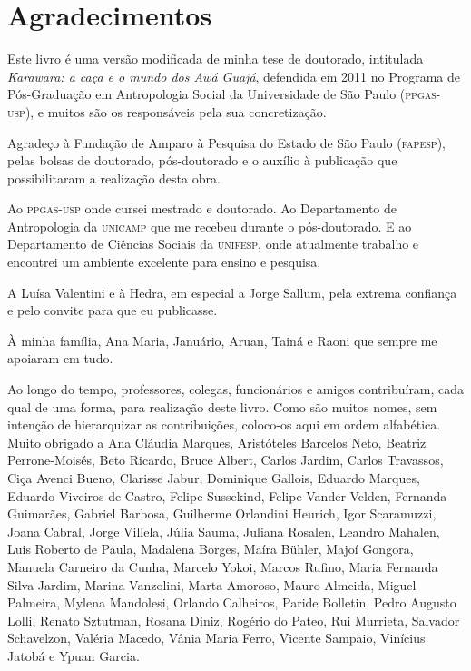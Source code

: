 \chapter{Agradecimentos}

Este livro é uma versão modificada de minha tese de doutorado,
intitulada \textit{Karawara: a caça e o mundo dos Awá Guajá}, defendida em
2011 no Programa de Pós-Graduação em Antropologia Social da Universidade
de São Paulo (\textsc{ppgas-usp}), e muitos são os responsáveis pela sua
concretização.

Agradeço à Fundação de Amparo à Pesquisa do Estado de São Paulo
(\textsc{fapesp}), pelas bolsas de doutorado, pós-doutorado e o auxílio à
publicação que possibilitaram a realização desta obra.

Ao \textsc{ppgas-usp} onde cursei mestrado e doutorado. Ao Departamento de
Antropologia da \textsc{unicamp} que me recebeu durante o pós-doutorado. E ao
Departamento de Ciências Sociais da \textsc{unifesp}, onde atualmente trabalho e
encontrei um ambiente excelente para ensino e pesquisa.

A Luísa Valentini e à Hedra, em especial a Jorge Sallum, pela
extrema confiança e pelo convite para que eu publicasse.

À minha família, Ana Maria, Januário, Aruan, Tainá e Raoni que sempre me
apoiaram em tudo.

Ao longo do tempo, professores, colegas, funcionários e amigos
contribuíram, cada qual de uma forma, para realização deste livro. Como
são muitos nomes, sem intenção de hierarquizar as contribuições,
coloco-os aqui em ordem alfabética. Muito obrigado a Ana Cláudia
Marques, Aristóteles Barcelos Neto, Beatriz Perrone-Moisés, Beto
Ricardo, Bruce Albert, Carlos Jardim, Carlos Travassos, Ciça Avenci
Bueno, Clarisse Jabur, Dominique Gallois, Eduardo Marques, Eduardo Viveiros de Castro,
Felipe Sussekind, Felipe Vander Velden, Fernanda Guimarães, Gabriel Barbosa, Guilherme
Orlandini Heurich, Igor Scaramuzzi, Joana Cabral, Jorge Villela, Júlia
Sauma, Juliana Rosalen, Leandro Mahalen, Luis Roberto de Paula, Madalena
Borges, Maíra Bühler, Majoí Gongora, Manuela Carneiro da Cunha, Marcelo
Yokoi, Marcos Rufino, Maria Fernanda Silva Jardim, Marina Vanzolini,
Marta Amoroso, Mauro Almeida, Miguel Palmeira, Mylena Mandolesi, Orlando Calheiros, Paride
Bolletin, Pedro Augusto Lolli, Renato Sztutman, Rosana Diniz, Rogério do
Pateo, Rui Murrieta, Salvador Schavelzon, Valéria Macedo, Vânia Maria Ferro, Vicente
Sampaio, Vinícius Jatobá e Ypuan Garcia.

